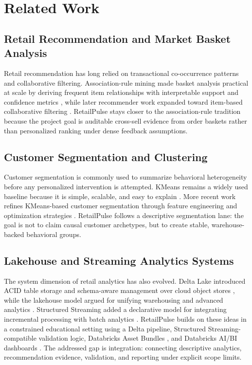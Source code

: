 \documentclass[journal]{IEEEtran}
\begin{document}
\section{Related Work}
\subsection{Retail Recommendation and Market Basket Analysis}
Retail recommendation has long relied on transactional co-occurrence patterns and collaborative filtering. Association-rule mining made basket analysis practical at scale by deriving frequent item relationships with interpretable support and confidence metrics \cite{agrawal1994association}, while later recommender work expanded toward item-based collaborative filtering \cite{sarwar2001itembased}. RetailPulse stays closer to the association-rule tradition because the project goal is auditable cross-sell evidence from order baskets rather than personalized ranking under dense feedback assumptions.

\subsection{Customer Segmentation and Clustering}
Customer segmentation is commonly used to summarize behavioral heterogeneity before any personalized intervention is attempted. KMeans remains a widely used baseline because it is simple, scalable, and easy to explain \cite{macqueen1967kmeans}. More recent work refines KMeans-based customer segmentation through feature engineering and optimization strategies \cite{li2021customersegmentation}. RetailPulse follows a descriptive segmentation lane: the goal is not to claim causal customer archetypes, but to create stable, warehouse-backed behavioral groups.

\subsection{Lakehouse and Streaming Analytics Systems}
The system dimension of retail analytics has also evolved. Delta Lake introduced ACID table storage and schema-aware management over cloud object stores \cite{armbrust2020deltalake}, while the lakehouse model argued for unifying warehousing and advanced analytics \cite{zaharia2021lakehouse}. Structured Streaming added a declarative model for integrating incremental processing with batch analytics \cite{armbrust2018structured}. RetailPulse builds on these ideas in a constrained educational setting using a Delta pipeline, Structured Streaming-compatible validation logic, Databricks Asset Bundles \cite{databricks_bundles}, and Databricks AI/BI dashboards \cite{databricks_dashboards}. The addressed gap is integration: connecting descriptive analytics, recommendation evidence, validation, and reporting under explicit scope limits.
\end{document}
